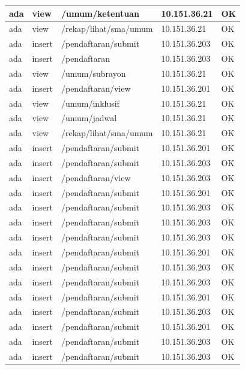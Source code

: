 \documentclass{ta-its}
\begin{document}
\begin{longtable}{|p{}|p{}|p{}|p{}|p{}|}
						ada & view & /umum/ketentuan & 10.151.36.21 & OK\\ \hline
						ada & view & /rekap/lihat/sma/umum & 10.151.36.21 & OK\\ \hline
						ada & insert & /pendaftaran/submit & 10.151.36.203 & OK\\ \hline
						ada & insert & /pendaftaran & 10.151.36.203 & OK\\ \hline
						ada & view & /umum/subrayon & 10.151.36.21 & OK\\ \hline
						ada & insert & /pendaftaran/view & 10.151.36.201 & OK\\ \hline
						ada & view & /umum/inklusif & 10.151.36.21 & OK\\ \hline
						ada & view & /umum/jadwal & 10.151.36.21 & OK\\ \hline
						ada & view & /rekap/lihat/sma/umum & 10.151.36.21 & OK\\ \hline
						ada & insert & /pendaftaran/submit & 10.151.36.201 & OK\\ \hline
						ada & insert & /pendaftaran/submit & 10.151.36.203 & OK\\ \hline
						ada & insert & /pendaftaran/view & 10.151.36.203 & OK\\ \hline
						ada & insert & /pendaftaran/submit & 10.151.36.201 & OK\\ \hline
						ada & insert & /pendaftaran/submit & 10.151.36.203 & OK\\ \hline
						ada & insert & /pendaftaran/submit & 10.151.36.203 & OK\\ \hline
						ada & insert & /pendaftaran/submit & 10.151.36.203 & OK\\ \hline
						ada & insert & /pendaftaran/submit & 10.151.36.201 & OK\\ \hline
						ada & insert & /pendaftaran/submit & 10.151.36.203 & OK\\ \hline
						ada & insert & /pendaftaran/submit & 10.151.36.203 & OK\\ \hline
						ada & insert & /pendaftaran/submit & 10.151.36.201 & OK\\ \hline
						ada & insert & /pendaftaran/submit & 10.151.36.203 & OK\\ \hline
						ada & insert & /pendaftaran/submit & 10.151.36.201 & OK\\ \hline
						ada & insert & /pendaftaran/submit & 10.151.36.203 & OK\\ \hline
						ada & insert & /pendaftaran/submit & 10.151.36.203 & OK\\ \hline

\end{longtable}
\end{document}
